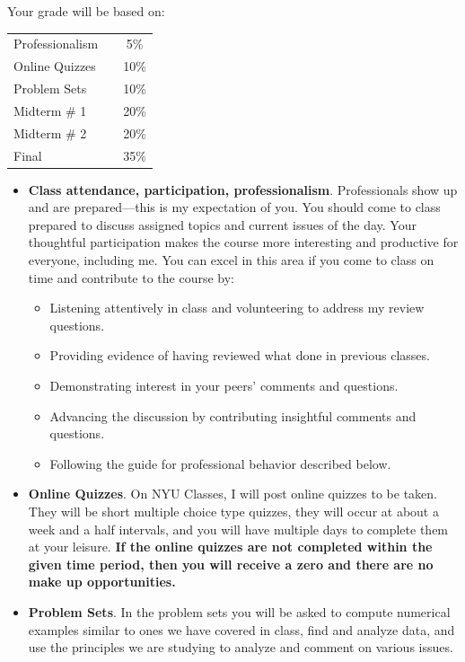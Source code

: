 \documentclass[12pt,pdftex,twoside,letterpaper]{exam}
\begin{document}
Your grade will be based on:
\begin{center}
\begin{tabular}{lcc}
    Professionalism &\hspace*{0.50in}&   5\%  \\
    Online Quizzes && 10\% \\
    Problem Sets &&  10\% \\
    Midterm \# 1 &&  20\% \\
    Midterm \# 2 &&  20\% \\
    Final &&  35\% \\
\end{tabular}
\end{center}
\begin{itemize}
\item \textbf{Class attendance, participation, professionalism}. Professionals show up and are prepared---this is my expectation of you. You should come to class prepared to discuss assigned topics and current issues of the day. Your thoughtful participation makes the course more interesting and productive for everyone, including me. You can excel in this area if you come to class on time and contribute to the course by:
\begin{itemize}
\item Listening attentively in class and volunteering to address my review questions.
\item Providing evidence of having reviewed what done in previous classes.
\item Demonstrating interest in your peers' comments and questions.
\item Advancing the discussion by contributing insightful comments and questions.
\item Following the guide for professional behavior described below.
\end{itemize}

\item \textbf{Online Quizzes}. On NYU Classes, I will post online quizzes to be taken. They will be short multiple choice type quizzes, they will occur at about a week and a half intervals, and you will have multiple days to complete them at your leisure. \textbf{If the online quizzes are not completed within the given time period, then you will receive a zero and there are no make up opportunities.}

\item \textbf{Problem Sets}. In the problem sets you will be asked to compute numerical examples similar to ones we have covered in class, find and analyze data, and use the principles we are studying to analyze and comment on various issues.


\end{itemize}
\end{document}
